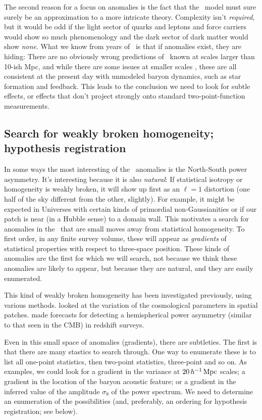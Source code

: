 \documentclass[12pt, fullpage, letterpaper]{article}
\begin{document}
The second reason for a focus on anomalies is the fact that the \LCDM\ model must sure surely be an approximation to a more intricate theory.
Complexity isn't \emph{required}, but it would be odd if the light sector of quarks and leptons and
force carriers would show so much phenomenology and the dark sector of
dark matter would show \emph{none}.
What we know from years of \LCDM\ is that if anomalies exist, they are
hiding: There are no obviously wrong predictions of \LCDM\ known at
scales larger than 10-ish Mpc, and while there are some issues at smaller scales \citep{Bullock2017}, these are
all consistent at the present day with unmodeled baryon dynamics, such as star formation and feedback.
This leads to the conclusion we need to look for subtle effects, or effects that
don't project strongly onto standard two-point-function measurements.

\subsection{Search for weakly broken homogeneity; hypothesis registration}

In some ways the most interesting of the \CMB\ anomalies is the
North-South power asymmetry. It's interesting because it is also
\emph{natural}: If statistical isotropy or homogeneity is weakly
broken, it will show up first as an $\ell=1$ distortion (one half of
the sky different from the other, slightly).
For example, it might be expected in Universes with certain kinds
of primordial non-Gaussianities \citep{Dalal2008} or if our patch is
near (in a Hubble sense) to a domain wall.
This motivates a search for anomalies in the \LSS\ that are small
moves away from statistical homogeneity.
To first order, in any finite survey volume, these will appear as
\emph{gradients} of statistical properties with respect to three-space
position.
These kinds of anomalies are the first for which we will search, not
because we think these anomalies are likely to appear, but because they
are natural, and they are easily enumerated.

This kind of weakly broken homogeneity has been investigated previously,
using various methods.
\cite{Mukherjee2018} looked at the variation of the cosmological parameters in spatial patches.
\cite{Zhai2017} made forecasts for detecting a hemispherical power asymmetry (similar to that seen in the CMB) in redshift surveys.

Even in this small space of anomalies (gradients), there are subtleties. The first
is that there are many stastics to search through.
One way to enumerate these is to list all one-point statistics, then two-point statistics, three-point and so on. As examples, we could look for a gradient in the variance at
$20\,h^{-1}\,{\mathrm{Mpc}}$ scales; a gradient in the location
of the baryon acoustic feature; or a gradient in the inferred value of the amplitude
$\sigma_8$ of the power spectrum.
We need to determine an enumeration of the possibilities (and, preferably, an
ordering for hypothesis registration; see below).
\end{document}
